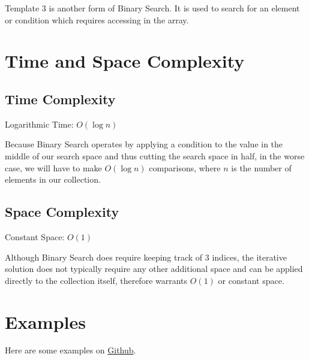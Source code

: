 Template 3 is another form of Binary Search.
It is used to search for an element or condition which requires accessing  in the array.

\section{Time and Space Complexity}
\label{sec:time-space-compl}

\subsection{Time Complexity}
\label{sec:time-complexity}


Logarithmic Time: \(O(\log n)\)

Because Binary Search operates by applying a condition to the value in the middle of our search space and thus cutting the search space in half, in the worse case, we will have to make \(O(\log n)\) comparisons, where \(n\) is the number of elements in our collection.

 \subsection{Space Complexity}
\label{sec:space-complexity}

Constant Space: \(O(1)\)

Although Binary Search does require keeping track of 3 indices, the iterative solution does not typically require any other additional space and can be applied directly to the collection itself, therefore warrants \(O(1)\) or constant space.


\section{Examples}
\label{sec:examples-4}

Here are some examples on \href{https://github.com/mingmingli916/algorithms/tree/main/binary_search}{Github}.
